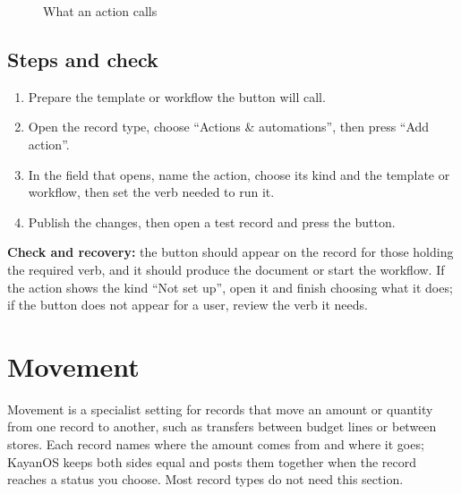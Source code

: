 \begin{figure}[H]
\centering
{}
\rclegend
\caption{What an action calls}
\label{fig:builder-actions-model}
\end{figure}

\subsection{Steps and check}
\begin{enumerate}
\item Prepare the template or workflow the button will call.
\item Open the record type, choose “Actions \& automations”, then press “Add action”.
\item In the field that opens, name the action, choose its kind and the template or workflow, then set the verb needed to run it.
\item Publish the changes, then open a test record and press the button.
\end{enumerate}

\textbf{Check and recovery:} the button should appear on the record for those holding the required verb, and it should produce the document or start the workflow. If the action shows the kind “Not set up”, open it and finish choosing what it does; if the button does not appear for a user, review the verb it needs.

\clearpage
\section{Movement}
\label{sec:builder-feature-movement}

Movement is a specialist setting for records that move an amount or quantity from one record to another, such as transfers between budget lines or between stores. Each record names where the amount comes from and where it goes; KayanOS keeps both sides equal and posts them together when the record reaches a status you choose. Most record types do not need this section.

